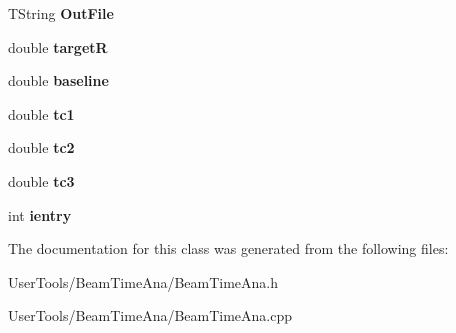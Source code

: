 \begin{DoxyCompactItemize}
\item 
\hypertarget{classBeamTimeAna_a4d2aeab4e93fc15010e6fd1bf56edcdb}{T\-String {\bfseries Out\-File}}\label{classBeamTimeAna_a4d2aeab4e93fc15010e6fd1bf56edcdb}

\item 
\hypertarget{classBeamTimeAna_aaf94fd2c4bae8719cb3e40a467d427cd}{double {\bfseries target\-R}}\label{classBeamTimeAna_aaf94fd2c4bae8719cb3e40a467d427cd}

\item 
\hypertarget{classBeamTimeAna_a0df7b44ed1be5e0f23c6384dc09b01ca}{double {\bfseries baseline}}\label{classBeamTimeAna_a0df7b44ed1be5e0f23c6384dc09b01ca}

\item 
\hypertarget{classBeamTimeAna_ac21d70b3320574398e3251092f2c7ef5}{double {\bfseries tc1}}\label{classBeamTimeAna_ac21d70b3320574398e3251092f2c7ef5}

\item 
\hypertarget{classBeamTimeAna_ac3ff88abf8e308b8fad48bf1a994f530}{double {\bfseries tc2}}\label{classBeamTimeAna_ac3ff88abf8e308b8fad48bf1a994f530}

\item 
\hypertarget{classBeamTimeAna_a64a9f3610a0412a83b6f090e1622ef79}{double {\bfseries tc3}}\label{classBeamTimeAna_a64a9f3610a0412a83b6f090e1622ef79}

\item 
\hypertarget{classBeamTimeAna_a9fc48b9d0c43a1d696139811d15ba3c7}{int {\bfseries ientry}}\label{classBeamTimeAna_a9fc48b9d0c43a1d696139811d15ba3c7}

\end{DoxyCompactItemize}


The documentation for this class was generated from the following files\-:\begin{DoxyCompactItemize}
\item 
User\-Tools/\-Beam\-Time\-Ana/Beam\-Time\-Ana.\-h\item 
User\-Tools/\-Beam\-Time\-Ana/Beam\-Time\-Ana.\-cpp\end{DoxyCompactItemize}
